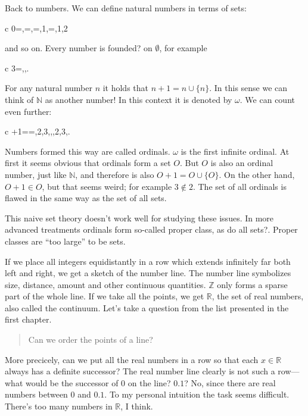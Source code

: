 \documentclass[11pt,oneside,%
]{memoir}
\newenvironment{eqna}{\begin{IEEEeqnarray}{c}}{\end{IEEEeqnarray}\ignorespacesafterend}
\newcommand{\NN}{\mathbb{N}}
\newcommand{\RR}{\mathbb{R}}
\newcommand{\ZZ}{\mathbb{Z}}
\begin{document}
Back to numbers. We can define natural numbers in terms of sets:
\begin{eqna}
    0=\emptyset,=\rbrace,=,1\rbrace,=,1,2\rbrace
\end{eqna}
and so on. Every number is founded? on \(\emptyset\), for example
\begin{eqna}
    3=\lbrace\emptyset,\lbrace\emptyset\rbrace,\lbrace\lbrace\emptyset\rbrace\rbrace\rbrace.
\end{eqna}
For any natural number \(n\) it holds that \(n+1=n\cup\lbrace n\rbrace\). In this sense we can think of \(\NN\) as another number! In this context it is denoted by \(\omega\).  We can count even further:
\begin{eqna}
    \omega+1=\omega\cup\lbrace\omega\rbrace=,2,3,\dotsc,,2,3,\dotsc\rbrace\rbrace.
\end{eqna}
Numbers formed this way are called ordinals. \(\omega\) is the first infinite ordinal. At first it seems obvious that ordinals form a set \(O\). But \(O\) is also an ordinal number, just like \(\NN\), and therefore is also \(O+1=O\cup\lbrace O\rbrace\). On the other hand, \(O+1\in O\), but that seems weird; for example \(3\notin 2\). The set of all ordinals is flawed in the same way as the set of all sets.

This naive set theory doesn't work well for studying these issues. In more advanced treatments ordinals form so-called proper class, as do all sets?. Proper classes are ``too large'' to be sets.

If we place all integers equidistantly in a row which extends infinitely far both left and right, we get a sketch of the number line. The number line symbolizes size, distance, amount and other continuous quantities. \(\ZZ\) only forms a sparse part of the whole line. If we take all the points, we get \(\RR\), the set of real numbers, also called the continuum. Let's take a question from the list presented in the first chapter.
\begin{quote}
    Can we order the points of a line?
\end{quote}
More precicely, can we put all the real numbers in a row so that each \(x\in\RR\) always has a definite successor? The real number line clearly is not such a row---what would be the successor of \(0\) on the line? \(0.1\)? No, since there are real numbers between \(0\) and \(0.1\). To my personal intuition the task seems difficult. There's too many numbers in \(\RR\), I think.
\end{document}
